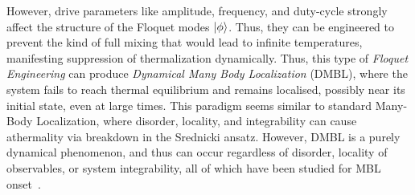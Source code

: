 \documentclass[%
reprint,
superscriptaddress,
amsmath,amssymb,
aps,
prb,
showkeys,
]{revtex4-2}
\begin{document}
However, drive parameters like amplitude, frequency, and duty-cycle strongly affect the structure of the Floquet modes $\ket{\phi}$. Thus, they can be engineered to prevent the kind of full mixing that would lead to infinite temperatures, manifesting suppression of thermalization dynamically. Thus, this type of \textit{Floquet Engineering} can produce \textit{Dynamical Many Body Localization} (DMBL), where the system fails to reach thermal equilibrium and remains localised, possibly  near its initial state, even at large times. This paradigm seems similar to standard Many-Body Localization, where disorder, locality, and integrability can cause athermality via breakdown in the Srednicki ansatz. However, DMBL is a purely dynamical phenomenon, and thus can occur regardless of disorder, locality of observables, or system integrability, all of which have been studied for MBL onset~\cite{Sougata2023,Fabien2018,garratt_resonant_2022}.
\end{document}
